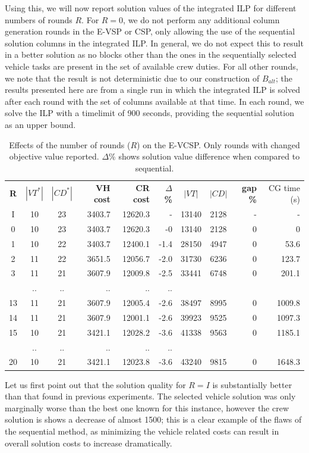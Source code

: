 \documentclass[]{article}
\begin{document}
Using this, we will now report solution values of the integrated ILP for different numbers of rounds $R$. For $R=0$, we do not perform any additional column generation rounds in the E-VSP or CSP, only allowing the use of the sequential solution columns in the integrated ILP. In general, we do not expect this to result in a better solution as no blocks other than the ones in the sequentially selected vehicle tasks are present in the set of available crew duties. For all other rounds, we note that the result is not deterministic due to our construction of $B_{alt}$; the results presented here are from a single run in which the integrated ILP is solved after each round with the set of columns available at that time. In each round, we solve the ILP with a timelimit of 900 seconds, providing the sequential solution as an upper bound.

\begin{table}[h]
  \centering
  \begin{tabular}{cccrrrccrr}
    \toprule
       \textbf{R} & $|VT^*|$ & $|CD^*|$ & \textbf{VH cost} & \textbf{CR cost} & \textbf{$\Delta$\%} & $|VT|$ & $|CD|$ & \textbf{gap \%} & CG time (s) \\
       \cmidrule(lr){1-1} \cmidrule(lr){2-6} \cmidrule(lr){7-8} \cmidrule(lr){9-10}
        I   & 10 & 23 & 3403.7 & 12620.3 & -    & 13140 & 2128 & - & -      \\
        0   & 10 & 23 & 3403.7 & 12620.3 & -0    & 13140 & 2128 & 0 & 0      \\
        1   & 10 & 22 & 3403.7 & 12400.1 & -1.4  & 28150 & 4947 & 0 & 53.6   \\
        2   & 11 & 22 & 3651.5 & 12056.7 & -2.0    & 31730 & 6236 & 0 & 123.7  \\
        3   & 11 & 21 & 3607.9 & 12009.8 & -2.5  & 33441 & 6748 & 0 & 201.1  \\
            & .. & .. & .. & .. & .. & \\
        13  & 11 & 21 & 3607.9 & 12005.4 & -2.6  & 38497 & 8995 & 0 & 1009.8 \\
        14  & 11 & 21 & 3607.9 & 12001.1 & -2.6  & 39923 & 9525 & 0 & 1097.3 \\
        15  & 10 & 21 & 3421.1 & 12028.2 & -3.6  & 41338 & 9563 & 0 & 1185.1 \\
            & .. & .. & .. & .. & .. & \\
        20  & 10 & 21 & 3421.1 & 12023.8 & -3.6  & 43240 & 9815 & 0 & 1648.3 \\
        \bottomrule
  \end{tabular}
  \caption{Effects of the number of rounds ($R$) on the E-VCSP. Only rounds with changed objective value reported. $\Delta$\% shows solution value difference when compared to sequential. }
  \label{tab:evcsp-rounds}
\end{table}
Let us first point out that the solution quality for $R=I$ is substantially better than that found in previous experiments. The selected vehicle solution was only marginally worse than the best one known for this instance, however the crew solution is shows a decrease of almost 1500; this is a clear example of the flaws of the sequential method, as minimizing the vehicle related costs can result in overall solution costs to increase dramatically.
\end{document}
